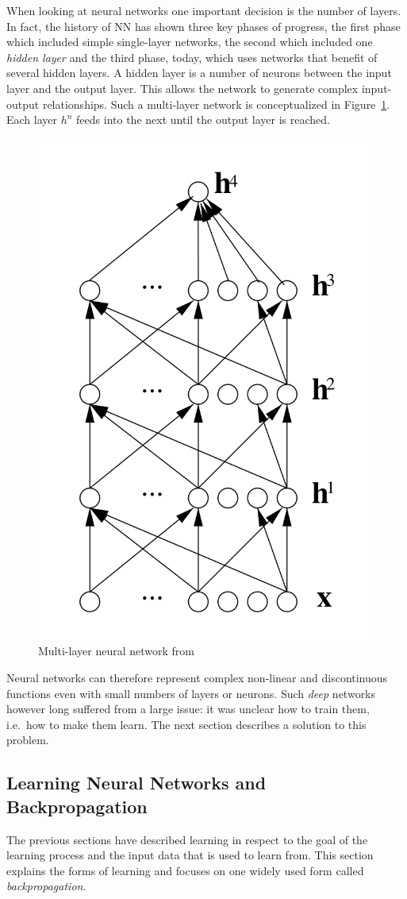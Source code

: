 When looking at neural networks one important decision is the number of layers. In fact, the history of \acl{NN} has shown
three key phases of progress, the first phase which included simple single-layer networks, the second which included one
\emph{hidden layer} and the third phase, today, which uses networks that benefit of several hidden layers. A hidden
layer is a number of neurons between the input layer and the output layer. This allows the network to generate complex
input-output relationships. Such a multi-layer network is conceptualized in Figure~\ref{fig:multilayernn}. Each layer
$h^n$ feeds into the next until the output layer is reached.

\begin{figure}[]
    \centering
    \includegraphics[width=0.3\linewidth]{img/multilayer_nn.png}
    \caption{Multi-layer neural network from \cite[]{bengio2009learning} }
    \label{fig:multilayernn}
\end{figure}

Neural networks can therefore represent complex non-linear and discontinuous functions
\cite[p.732]{russell2016artificial} even with small numbers of layers or neurons. Such \emph{deep} networks however long
suffered from a large issue: it was unclear how to train them, i.e.\ how to make them learn. The next section describes
a solution to this problem.

\subsection{Learning Neural Networks and Backpropagation}
\label{sec:Backpropagation}




The previous sections have described learning in respect to the goal of the learning process and the input data that is
used to learn from. This section explains the forms of learning and focuses on one widely used form called \emph{backpropagation}.

